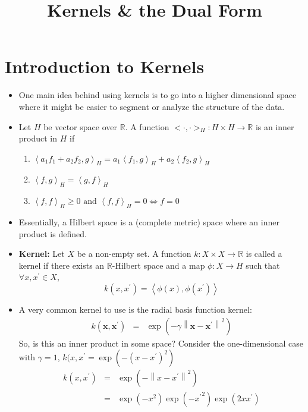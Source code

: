 \documentclass[12pt,letterpaper]{article}
\title{Kernels \& the Dual Form }
\begin{document}
\maketitle

\section{Introduction to Kernels}
\begin{itemize}

\item One main idea behind using kernels is to go into a higher dimensional space where it might be easier to segment or analyze the structure of the data.  

\item {} Let $H$ be vector space over $\mathbb{R}$.  A function $<\cdot, \cdot>_H : H\times H \rightarrow \mathbb{R}$ is an inner product in $H$ if
\begin{enumerate}
\item $\left<a_1f_1 + a_2f_2, g\right>_H = a_1\left<f_1, g\right>_H + a_2\left<f_2, g\right>_H$

\item $\left<f,g\right>_H = \left<g,f\right>_H$

\item $\left<f,f\right>_H \ge 0 \text{ and } \left<f,f\right>_H = 0 \iff f = 0$
\end{enumerate}

\item Essentially, a Hilbert space is a (complete metric) space where an inner product is defined.  

\item \textbf{Kernel:} Let $X$ be a non-empty set.  A function $k: X \times X \rightarrow \mathbb{R}$ is called a kernel if there exists an $\mathbb{R}$-Hilbert space and a map $\phi: X \rightarrow H$ such that $\forall x, x^{\prime} \in X$, 
\begin{equation}
k(x, x^{\prime}) = \left<\phi(x), \phi(x^{\prime})\right>
\end{equation}

\item A very common kernel to use is the radial basis function kernel:
\begin{eqnarray}
k(\mathbf{x}, \mathbf{x}^{\prime}) &=& \exp(-\gamma \left\| \mathbf{x} - \mathbf{x}^{\prime} \right\|^2)
\end{eqnarray}
So, is this an inner product in some space?
Consider the one-dimensional case with $\gamma = 1$, $k(x,x^{\prime} = \exp(-(x - x^{\prime})^2)$ 
\begin{eqnarray}
k({x}, {x}^{\prime}) &=& \exp(- \left\| {x} - {x}^{\prime} \right\|^2)\\
&=& \exp(-x^2)\exp(-{x^{\prime}}^2)\exp(2xx^{\prime})
\end{eqnarray}


\end{itemize}
\end{document}
